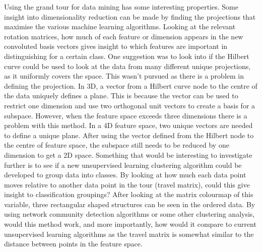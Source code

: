 \documentclass[a4paper,11pt,twoside]{article}
\begin{document}
Using the grand tour for data mining has some interesting properties. Some insight into dimensionality reduction can be made by finding the projections that maximise the various machine learning algorithms. Looking at the relevant rotation matrices, how much of each feature or dimension appears in the new convoluted basis vectors gives insight to which features are important in distinguishing for a certain class.
\newline
\newline
One suggestion was to look into if the Hilbert curve could be used to look at the data from many different unique projections, as it uniformly covers the space. This wasn’t pursued as there is a problem in defining the projection. In 3D, a vector from a Hilbert curve node to the centre of the data uniquely defines a plane. This is because the vector can be used to restrict one dimension and use two orthogonal unit vectors to create a basis for a subspace. However, when the feature space exceeds three dimensions there is a problem with this method. In a 4D feature space, two unique vectors are needed to define a unique plane. After using the vector defined from the Hilbert node to the centre of feature space, the subspace still needs to be reduced by one dimension to get a 2D space. 
\newline
\newline
Something that would be interesting to investigate further is to see if a new unsupervised learning clustering algorithm could be developed to group data into classes. By looking at how much each data point moves relative to another data point in the tour (travel matrix), could this give insight to classification groupings? After looking at the matrix colourmap of this variable, three rectangular shaped structures can be seen in the ordered data. By using network community detection algorithms or some other clustering analysis, would this method work, and more importantly, how would it compare to current unsupervised learning algorithms as the travel matrix is somewhat similar to the distance between points in the feature space.
\end{document}
